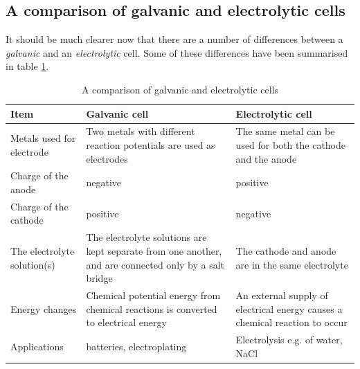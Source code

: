 \subsection{A comparison of galvanic and electrolytic cells}

It should be much clearer now that there are a number of differences between a \textit{galvanic} and an \textit{electrolytic} cell. Some of these differences have been summarised in table \ref{tab:electrochemical:comparison}.

\begin{table}[h]
\begin{center}
\begin{tabular}{|p{4cm}|p{4cm}|p{4cm}|}\hline
\textbf{Item} & \textbf{Galvanic cell} & \textbf{Electrolytic cell}\\\hline
Metals used for electrode & Two metals with different reaction potentials are used as electrodes & The same metal can be used for both the cathode and the anode \\\hline
Charge of the anode & negative & positive \\\hline
Charge of the cathode & positive & negative \\\hline
The electrolyte solution(s) & The electrolyte solutions are kept separate from one another, and are connected only by a salt bridge & The cathode and anode are in the same electrolyte \\\hline
Energy changes & Chemical potential energy from chemical reactions is converted to electrical energy & An external supply of electrical energy causes a chemical reaction to occur \\\hline
Applications & batteries, electroplating & Electrolysis e.g. of water, NaCl \\\hline

\end{tabular}
\end{center}
\caption{A comparison of galvanic and electrolytic cells}
\label{tab:electrochemical:comparison}
\end{table} 

